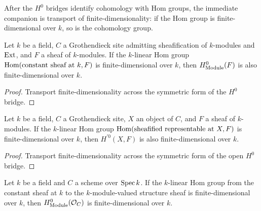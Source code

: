 After the \(H^0\) bridges identify cohomology with Hom groups, the immediate companion is transport of finite-dimensionality: if the Hom group is finite-dimensional over \(k\), so is the cohomology group.

\begin{theorem}\label{mk-thm:Scheme_module_finite_HModule_zero}
  \leanok


  Let \(k\) be a field, \(C\) a Grothendieck site admitting sheafification of \(k\)-modules and \(\operatorname{Ext}\), and \(F\) a sheaf of \(k\)-modules. If the \(k\)-linear Hom group \(\operatorname{Hom}(\text{constant sheaf at }k, F)\) is finite-dimensional over \(k\), then \(H^0_{\mathrm{Module}}(F)\) is also finite-dimensional over \(k\).
\end{theorem}

\begin{proof}
  \leanok

  Transport finite-dimensionality across the symmetric form of the \(H^0\) bridge.
\end{proof}

\begin{theorem}\label{mk-thm:Scheme_module_finite_HModule_prime_zero}
  \leanok

  Let \(k\) be a field, \(C\) a Grothendieck site, \(X\) an object of \(C\), and \(F\) a sheaf of \(k\)-modules. If the \(k\)-linear Hom group \(\operatorname{Hom}(\text{sheafified representable at }X, F)\) is finite-dimensional over \(k\), then \(H^{\prime 0}(X, F)\) is also finite-dimensional over \(k\).
\end{theorem}

\begin{proof}
  \leanok

  Transport finite-dimensionality across the symmetric form of the open \(H^0\) bridge.
\end{proof}


\begin{theorem}\label{mk-thm:Scheme_module_finite_HModule_zero_curve}
  \leanok

  Let \(k\) be a field and \(C\) a scheme over \(\operatorname{Spec} k\). If the \(k\)-linear Hom group from the constant sheaf at \(k\) to the \(k\)-module-valued structure sheaf is finite-dimensional over \(k\), then \(H^0_{\mathrm{Module}}(\mathcal O_C)\) is finite-dimensional over \(k\).
\end{theorem}

